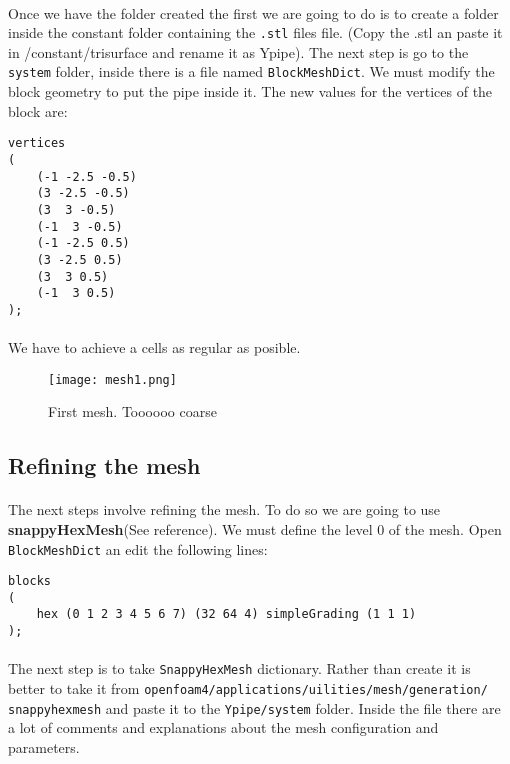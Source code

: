 \paragraph{}Once we have the folder created the first we are going to do is to create a folder inside the constant folder containing the \texttt{.stl} files file. (Copy the .stl an paste it in /constant/trisurface and rename it as Ypipe). The next step is  go to the  \texttt{system} folder, inside there is a file named \texttt{BlockMeshDict}. We must modify the block geometry to put the pipe inside it. The new values for the vertices of the block are:
\begin{center}
\begin{lstlisting}
vertices
(
    (-1 -2.5 -0.5)
    (3 -2.5 -0.5)
    (3  3 -0.5)
    (-1  3 -0.5)
    (-1 -2.5 0.5)
    (3 -2.5 0.5)
    (3  3 0.5)
    (-1  3 0.5)
);
\end{lstlisting}
\end{center}
\paragraph{}We have to achieve a cells as regular as posible.
\begin{figure}[h!]
\centering
\texttt{[image: mesh1.png]}
\caption{First mesh. Toooooo coarse}
\end{figure}

\subsection{Refining the mesh}
\paragraph{}The next steps involve refining the mesh. To do so we are going to use \textbf{snappyHexMesh}(See reference). We must define the level 0 of the mesh. Open \texttt{BlockMeshDict} an edit the following lines:
\begin{center}
\begin{lstlisting}
blocks
(
    hex (0 1 2 3 4 5 6 7) (32 64 4) simpleGrading (1 1 1)
);
\end{lstlisting}
\end{center}

\paragraph{}The next step is to take \texttt{SnappyHexMesh} dictionary. Rather than create it is better to take it from \texttt{openfoam4/applications/uilities/mesh/generation/\\snappyhexmesh} and paste it to the \texttt{Ypipe/system} folder. Inside the file there are a lot of comments and explanations about the mesh configuration and parameters.

